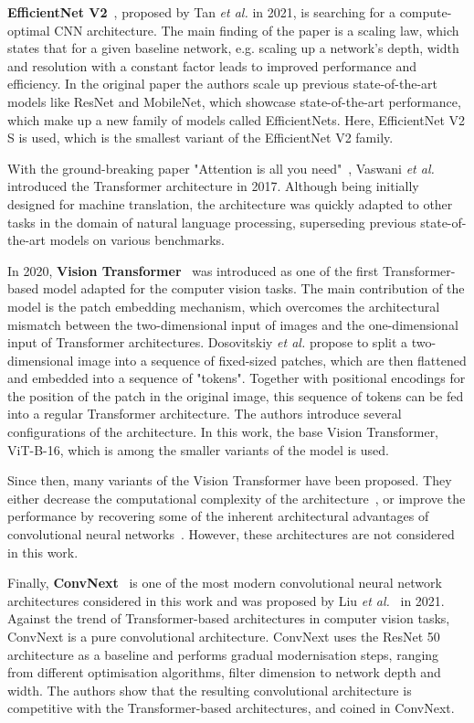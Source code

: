 \documentclass[a4paper]{article}
\begin{document}
\textbf{EfficientNet V2}~\cite{efficientnetv2}, proposed by Tan \textit{et al.}
in 2021, is searching for a compute-optimal CNN architecture. The main finding
of the paper is a scaling law, which states that for a given baseline network,
e.g. scaling up a network's depth, width and resolution with a constant factor
leads to improved performance and efficiency. In the original paper the authors
scale up previous state-of-the-art models like ResNet and MobileNet, which
showcase state-of-the-art performance, which make up a new family of models
called EfficientNets. Here, EfficientNet V2 S is used, which is the smallest
variant of the EfficientNet V2 family.

With the ground-breaking paper "Attention is all you need"~\cite{transformer},
Vaswani \textit{et al.} introduced the Transformer architecture in 2017.
Although being initially designed for machine translation, the architecture was
quickly adapted to other tasks in the domain of natural language processing,
superseding previous state-of-the-art models on various benchmarks. 

In 2020, \textbf{Vision Transformer}~\cite{vit} was introduced as one of the
first Transformer-based model adapted for the computer vision tasks. The main
contribution of the model is the patch embedding mechanism, which overcomes the
architectural mismatch between the two-dimensional input of images and the
one-dimensional input of Transformer architectures. Dosovitskiy \textit{et al.}
propose to split a two-dimensional image into a sequence of fixed-sized
patches, which are then flattened and embedded into a sequence of "tokens".
Together with positional encodings for the position of the patch in the original
image, this sequence of tokens can be fed into a regular Transformer
architecture. The authors introduce several configurations of the architecture.
In this work, the base Vision Transformer, ViT-B-16, which is among the smaller
variants of the model is used.

Since then, many variants of the Vision Transformer have been proposed. They
either decrease the computational complexity of the architecture~\cite{deit,
vitlite}, or improve the performance by recovering some of the inherent
architectural advantages of convolutional neural networks~\cite{swin}. However,
these architectures are not considered in this work.

Finally, \textbf{ConvNext}~\cite{convnext} is one of the most modern
convolutional neural network architectures considered in this work and was
proposed by Liu \textit{et al.}~\cite{convnext} in 2021. Against the trend of
Transformer-based architectures in computer vision tasks, ConvNext is a pure
convolutional architecture. ConvNext uses the ResNet 50~\cite{resnet}
architecture as a baseline and performs gradual modernisation steps, ranging
from different optimisation algorithms, filter dimension to network depth and
width. The authors show that the resulting convolutional architecture is
competitive with the Transformer-based architectures, and coined in ConvNext.
\end{document}
